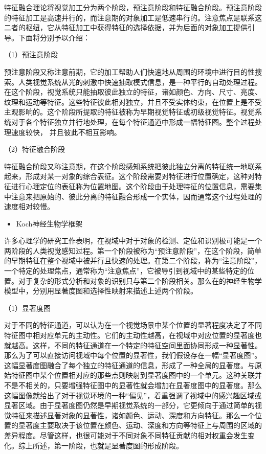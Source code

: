 \documentclass[a4paper,10pt]{article}\large
\begin{document}
特征融合理论将视觉加工分为两个阶段，预注意阶段和特征融合阶段。预注意阶段的特征加工是高速并行的，而注意期的对象加工是低速串行的。注意焦点是联系这二者的枢纽，它从特征加工中获得特征的选择依据，并为后面的对象加工提供引导。下面将分别予以介绍：


（1）预注意阶段

预注意阶段又称注意前期，它的加工帮助人们快速地从周围的环境中进行目的性搜索。人类视觉系统从光的刺激中快速抽取模式信息，是一种平行的自动处理过程。在这个阶段，视觉系统只能抽取彼此独立的特征，诸如颜色、方向、尺寸、亮度、纹理和运动等特征。这些特征彼此相对独立，并且不受实体约束，在位置上是不受主观影响的。这个阶段所提取的特征被称为早期视觉特征或初级视觉特征。视觉系统对于各个特征独立并行地处理，在每个特征通道中形成一幅特征图。整个过程处理速度较快，
并且彼此不相互影响。

（2）特征融合阶段

特征融合阶段又称注意期，在这个阶段感知系统把彼此独立分离的特征统一地联系起来，形成对某一对象的综合表征。这个阶段需要对特征进行位置确定，这种对特征进行心理定位的表征称为位置地图。这个阶段由于处理特征的位置信息，需要集中注意来把原始的、彼此分离的特征融合形成一个实体，因而通常这个过程处理的速度相对较慢。


\begin{itemize}
\item Koch神经生物学框架
\end{itemize} 


许多心理学的研究工作表明，在视域中对于对象的检测、定位和识别极可能是一个两阶段的人类视觉感知过程。第一个阶段被称为“预注意阶段”，在这个阶段，简单的早期特征在整个视域中被并行且快速的处理。在第二个阶段，称为“注意阶段”，一个特定的处理焦点，通常称为“注意焦点”，它被导引到视域中的某些特定的位置。对于复杂的形式分析和对象的识别只与第二个阶段相关。那么在的神经生物学模型中，分别用显著度图和选择性映射来描述上述两个阶段。

（1）显著度图

对于不同的特征通道，可以认为在一个视觉场景中某个位置的显著程度决定了不同特征图中相对应单元的主动性。它们的主动性越高，在视域中对应位置的显著度也就越高。这样，不同的特征通道在一个特定的特征空间里面协同形成一种显著性。那么为了可以直接访问视域中每个位置的显著性，我们假设存在一幅“显著度图”。这幅显著度图融合了每个独立的特征通道的信息，形成了一种全局的显著度。与原始特征图中某个位置相对应的那些点则映射到显著度图中的一个单元。这种关联并不是不相关的，只要增强特征图中的显著性就会增加在显著度图中的显著度。那么这幅图像就给出了对于视觉环境的一种“偏见”，着重强调了视域中的感兴趣区域或显著区域。由于显著度图仍然是早期视觉系统的一部分，它更倾向于通过简单的视觉特征来描述显著对象的显著性，诸如颜色、运动、深度和方向特征。那么一个位置的显著度主要取决于该位置在颜色、运动、深度和方向等特征上与周围的区域的差异程度。尽管这样，也很可能对于不同对象不同特征贡献的相对权重会发生变化。综上所述，第一阶段，也就是显著度图的形成阶段。
\end{document}
